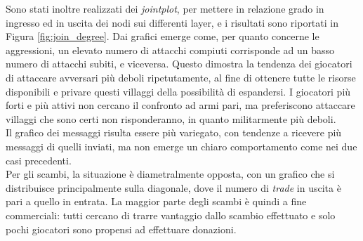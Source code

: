 Sono stati inoltre realizzati dei \textit{jointplot}, per mettere in relazione grado in ingresso ed in uscita dei nodi sui differenti layer, e i risultati sono riportati in Figura \ref{fig:join_degree}. Dai grafici emerge come, per quanto concerne le aggressioni, un elevato numero di attacchi compiuti corrisponde ad un basso numero di attacchi subiti, e viceversa. Questo dimostra la tendenza dei giocatori di attaccare avversari più deboli ripetutamente, al fine di ottenere tutte le risorse disponibili e privare questi villaggi della possibilità di espandersi. I giocatori più forti e più attivi non cercano il confronto ad armi pari, ma preferiscono attaccare villaggi che sono certi non risponderanno, in quanto militarmente più deboli.\\
Il grafico dei messaggi risulta essere più variegato, con tendenze a ricevere più messaggi di quelli inviati, ma non emerge un chiaro comportamento come nei due casi precedenti.\\
Per gli scambi, la situazione è diametralmente opposta, con un grafico che si distribuisce principalmente sulla diagonale, dove il numero di \textit{trade} in uscita è pari a quello in entrata. La maggior parte degli scambi è quindi a fine commerciali: tutti cercano di trarre vantaggio dallo scambio effettuato e solo pochi giocatori sono propensi ad effettuare donazioni.
